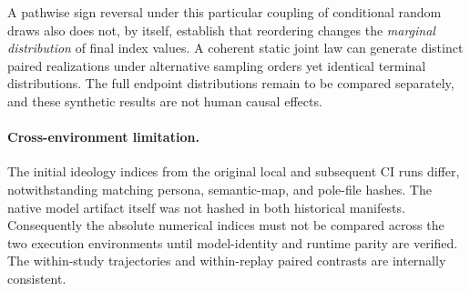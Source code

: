 A pathwise sign reversal under this particular coupling of conditional
random draws also does not, by itself, establish that reordering changes
the \emph{marginal distribution} of final index values. A coherent static
joint law can generate distinct paired realizations under alternative
sampling orders yet identical terminal distributions. The full endpoint
distributions remain to be compared separately, and these synthetic results
are not human causal effects.

\paragraph{Cross-environment limitation.}
The initial ideology indices from the original local and subsequent CI
runs differ, notwithstanding matching persona, semantic-map, and pole-file
hashes. The native model artifact itself was not hashed in both historical
manifests. Consequently the absolute numerical indices must not be compared
across the two execution environments until model-identity and runtime parity
are verified. The within-study trajectories and within-replay paired
contrasts are internally consistent.